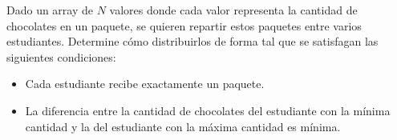 Dado un array de \(N\) valores donde cada valor representa la cantidad de chocolates en un paquete, se quieren repartir estos paquetes entre varios estudiantes. Determine cómo distribuirlos de forma tal que se satisfagan las siguientes condiciones:
\begin{itemize}
    \item Cada estudiante recibe exactamente un paquete.
    \item La diferencia entre la cantidad de chocolates del estudiante con la mínima cantidad y la del estudiante con la máxima cantidad es mínima.
\end{itemize}